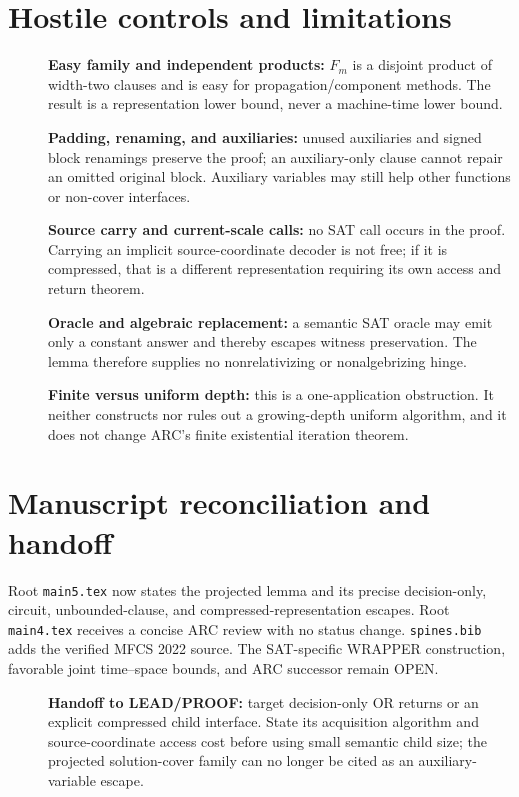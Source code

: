\documentclass[11pt]{article}
\begin{document}
\section{Hostile controls and limitations}
\begin{description}
\item[] \textbf{Easy family and independent products:} $F_m$ is a disjoint
product of width-two clauses and is easy for propagation/component methods.
The result is a representation lower bound, never a machine-time lower bound.
\item[] \textbf{Padding, renaming, and auxiliaries:} unused auxiliaries and
signed block renamings preserve the proof; an auxiliary-only clause cannot
repair an omitted original block.  Auxiliary variables may still help other
functions or non-cover interfaces.
\item[] \textbf{Source carry and current-scale calls:} no SAT call occurs in
the proof.  Carrying an implicit source-coordinate decoder is not free; if it
is compressed, that is a different representation requiring its own access
and return theorem.
\item[] \textbf{Oracle and algebraic replacement:} a semantic SAT oracle may
emit only a constant answer and thereby escapes witness preservation.  The
lemma therefore supplies no nonrelativizing or nonalgebrizing hinge.
\item[] \textbf{Finite versus uniform depth:} this is a one-application
obstruction.  It neither constructs nor rules out a growing-depth uniform
algorithm, and it does not change ARC's finite existential iteration theorem.
\end{description}

\section{Manuscript reconciliation and handoff}
Root \texttt{main5.tex} now states the projected lemma and its precise
decision-only, circuit, unbounded-clause, and compressed-representation
escapes.  Root \texttt{main4.tex} receives a concise ARC review with no status
change.  \texttt{spines.bib} adds the verified MFCS 2022 source.  The
SAT-specific WRAPPER construction, favorable joint time--space bounds, and
ARC successor remain OPEN.

\begin{description}
\item[] \textbf{Handoff to LEAD/PROOF:} target decision-only OR returns or an
explicit compressed child interface.  State its acquisition algorithm and
source-coordinate access cost before using small semantic child size; the
projected solution-cover family can no longer be cited as an auxiliary-variable
escape.
\end{description}



\end{document}
